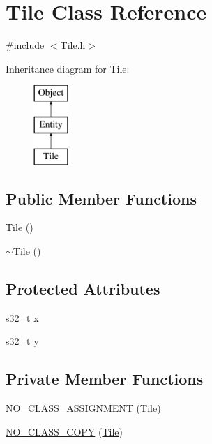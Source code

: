 \section{Tile Class Reference}
\label{class_tile}


{\ttfamily \#include $<$Tile.\-h$>$}

Inheritance diagram for Tile\-:\begin{figure}[H]
\begin{center}
\leavevmode
\includegraphics[height=3.000000cm]{class_tile}
\end{center}
\end{figure}
\subsection*{Public Member Functions}
\begin{DoxyCompactItemize}
\item 
\hyperlink{class_tile_aeeb5593bb6b75aae2edfcccbc84ab378}{Tile} ()
\item 
\hyperlink{class_tile_a98634abbd93fa13d0578d7103202d03d}{$\sim$\-Tile} ()
\end{DoxyCompactItemize}
\subsection*{Protected Attributes}
\begin{DoxyCompactItemize}
\item 
\hyperlink{types_8h_aeeae8d6781b7e821dd3e743202314d66}{s32\-\_\-t} \hyperlink{class_tile_a5c518a00b6fc79697c58fee04564b6ff}{x}
\item 
\hyperlink{types_8h_aeeae8d6781b7e821dd3e743202314d66}{s32\-\_\-t} \hyperlink{class_tile_aec5aaca3c8e0e89293a8da1741a8fc0f}{y}
\end{DoxyCompactItemize}
\subsection*{Private Member Functions}
\begin{DoxyCompactItemize}
\item 
\hyperlink{class_tile_a3ee7c9416b16fe43cd58946033b56562}{N\-O\-\_\-\-C\-L\-A\-S\-S\-\_\-\-A\-S\-S\-I\-G\-N\-M\-E\-N\-T} (\hyperlink{class_tile}{Tile})
\item 
\hyperlink{class_tile_a1c4496c8e87f16db11c4161d4e0e8b74}{N\-O\-\_\-\-C\-L\-A\-S\-S\-\_\-\-C\-O\-P\-Y} (\hyperlink{class_tile}{Tile})
\end{DoxyCompactItemize}
